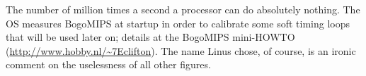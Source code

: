 
The number of million times a second a processor can do absolutely nothing. The
 OS measures BogoMIPS at startup in order to calibrate some
soft timing loops that will be used later on; details at the BogoMIPS mini-HOWTO
(\url{http://www.hobby.nl/~7Eclifton}). The name Linus chose, of course, is an
ironic comment on the uselessness of all other  figures.


